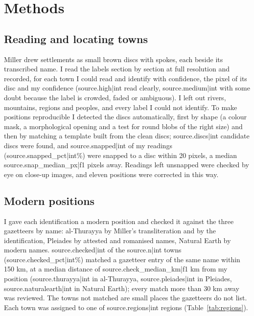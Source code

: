\documentclass[11pt,a4paper]{article}
\begin{document}
\section{Methods}
\subsection{Reading and locating towns}
Miller drew settlements as small brown discs with spokes, each beside its transcribed name. I read the labels section by section at full resolution and recorded, for each town I could read and identify with confidence, the pixel of its disc and my confidence ({{source.high|int}} read clearly, {{source.medium|int}} with some doubt because the label is crowded, faded or ambiguous). I left out rivers, mountains, regions and peoples, and every label I could not identify. To make positions reproducible I detected the discs automatically, first by shape (a colour mask, a morphological opening and a test for round blobs of the right size) and then by matching a template built from the clean discs; {{source.discs|int}} candidate discs were found, and {{source.snapped|int}} of my readings ({{source.snapped_pct|int}}\%) were snapped to a disc within 20 pixels, a median {{source.snap_median_px|f1}} pixels away. Readings left unsnapped were checked by eye on close-up images, and eleven positions were corrected in this way.

\subsection{Modern positions}
I gave each identification a modern position and checked it against the three gazetteers by name: al-Thurayya by Miller's transliteration and by the identification, Pleiades by attested and romanised names, Natural Earth by modern names. {{source.checked|int}} of the {{source.n|int}} towns ({{source.checked_pct|int}}\%) matched a gazetteer entry of the same name within 150 km, at a median distance of {{source.check_median_km|f1}} km from my position ({{source.thurayya|int}} in al-Thurayya, {{source.pleiades|int}} in Pleiades, {{source.naturalearth|int}} in Natural Earth); every match more than 30 km away was reviewed. The towns not matched are small places the gazetteers do not list. Each town was assigned to one of {{source.regions|int}} regions (Table~\ref{tab:regions}).
\end{document}
